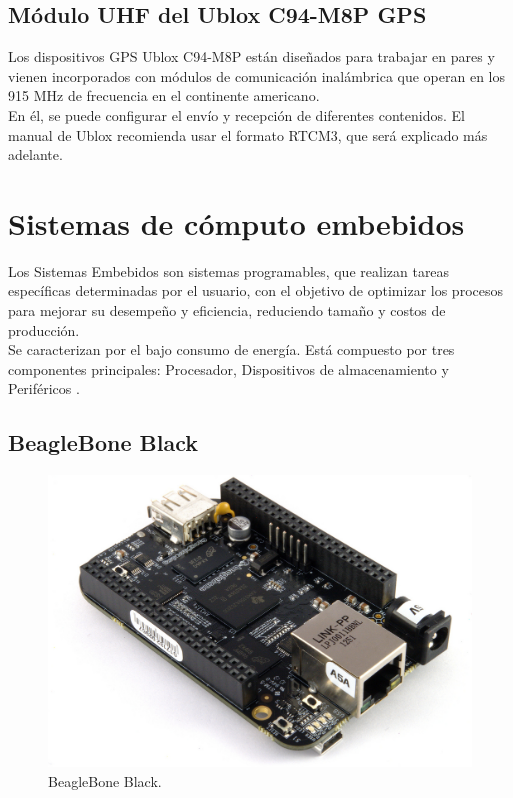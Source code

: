 \subsection{Módulo UHF del Ublox C94-M8P GPS}

Los dispositivos GPS Ublox C94-M8P están diseñados para trabajar en pares y vienen incorporados con módulos de comunicación inalámbrica que operan en los 915 MHz de frecuencia en el continente americano. \\

En él, se puede configurar el envío y recepción de diferentes contenidos. El manual de Ublox recomienda usar el formato RTCM3, que será explicado más adelante.

\section{Sistemas de cómputo embebidos}

Los Sistemas Embebidos son sistemas programables, que realizan tareas específicas determinadas por el usuario, con el objetivo de optimizar los procesos para mejorar su desempeño y eficiencia, reduciendo tamaño y costos de producción. \\

Se caracterizan por el bajo consumo de energía. Está compuesto por tres componentes principales: Procesador, Dispositivos de almacenamiento y Periféricos \cite{caballero2014desarrollo}.

\subsection{BeagleBone Black}

\begin{figure}[ht]
\centering
\includegraphics[scale=0.18]{Figures/BeagleBoneBlack}
\caption[BeagleBone Black.]{BeagleBone Black\footnotemark.}
\label{fig:BBlack}
\end{figure}


